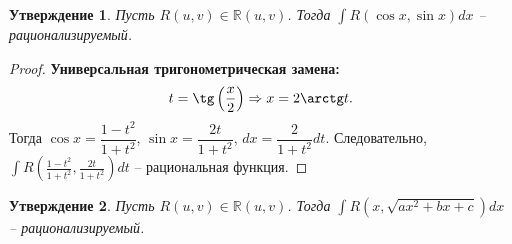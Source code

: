 \documentclass{article}
\theoremstyle{plain}
\newtheorem{claim}{Утверждение}
\theoremstyle{definition}
\theoremstyle{remark}
\renewcommand{\*}{\cdot}
\begin{document}
\begin{claim}
Пусть $R(u, v) \in\mathbb{R}(u, v)$. Тогда $\int R(\cos x, \sin x)dx$ -- рационализируемый.
\end{claim}

\begin{proof}
\textbf{Универсальная тригонометрическая замена:}
$$t=\tg\left(\frac{x}{2}\right)\Rightarrow x=2\arctg t.$$
Тогда $\cos x = \dfrac{1-t^2}{1+t^2}$, $\sin x =\dfrac{2t}{1+t^2}$, $dx = \dfrac{2}{1+t^2}dt$. Следовательно,  $\displaystyle \int R\left(\frac{1-t^2}{1+t^2}, \frac{2t}{1+t^2}\right)dt$ -- рациональная функция.
\end{proof}

\begin{claim}\label{cl:eulersubst}
Пусть $R(u, v) \in\mathbb{R}(u, v)$. Тогда $\int R(x, \sqrt{ax^2+bx+c})dx$ -- рационализируемый.
\end{claim}
\end{document}
